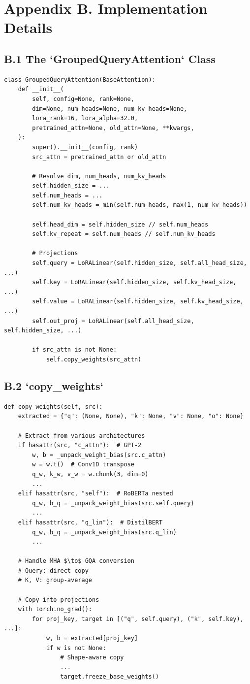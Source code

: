 
\section{Appendix B. Implementation Details}

\subsection{B.1 The `GroupedQueryAttention` Class}

\begin{lstlisting}
class GroupedQueryAttention(BaseAttention):
    def __init__(
        self, config=None, rank=None,
        dim=None, num_heads=None, num_kv_heads=None,
        lora_rank=16, lora_alpha=32.0,
        pretrained_attn=None, old_attn=None, **kwargs,
    ):
        super().__init__(config, rank)
        src_attn = pretrained_attn or old_attn
        
        # Resolve dim, num_heads, num_kv_heads
        self.hidden_size = ...
        self.num_heads = ...
        self.num_kv_heads = min(self.num_heads, max(1, num_kv_heads))
        
        self.head_dim = self.hidden_size // self.num_heads
        self.kv_repeat = self.num_heads // self.num_kv_heads
        
        # Projections
        self.query = LoRALinear(self.hidden_size, self.all_head_size, ...)
        self.key = LoRALinear(self.hidden_size, self.kv_head_size, ...)
        self.value = LoRALinear(self.hidden_size, self.kv_head_size, ...)
        self.out_proj = LoRALinear(self.all_head_size, self.hidden_size, ...)
        
        if src_attn is not None:
            self.copy_weights(src_attn)
\end{lstlisting}

\subsection{B.2 `copy\_weights`}

\begin{lstlisting}
def copy_weights(self, src):
    extracted = {"q": (None, None), "k": None, "v": None, "o": None}
    
    # Extract from various architectures
    if hasattr(src, "c_attn"):  # GPT-2
        w, b = _unpack_weight_bias(src.c_attn)
        w = w.t()  # Conv1D transpose
        q_w, k_w, v_w = w.chunk(3, dim=0)
        ...
    elif hasattr(src, "self"):  # RoBERTa nested
        q_w, b_q = _unpack_weight_bias(src.self.query)
        ...
    elif hasattr(src, "q_lin"):  # DistilBERT
        q_w, b_q = _unpack_weight_bias(src.q_lin)
        ...
    
    # Handle MHA $\to$ GQA conversion
    # Query: direct copy
    # K, V: group-average
    
    # Copy into projections
    with torch.no_grad():
        for proj_key, target in [("q", self.query), ("k", self.key), ...]:
            w, b = extracted[proj_key]
            if w is not None:
                # Shape-aware copy
                ...
                target.freeze_base_weights()
\end{lstlisting}

